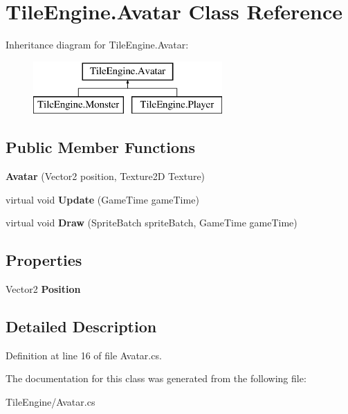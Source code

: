 \hypertarget{class_tile_engine_1_1_avatar}{\section{Tile\-Engine.\-Avatar Class Reference}
\label{class_tile_engine_1_1_avatar}
}
Inheritance diagram for Tile\-Engine.\-Avatar\-:\begin{figure}[H]
\begin{center}
\leavevmode
\includegraphics[height=2.000000cm]{class_tile_engine_1_1_avatar}
\end{center}
\end{figure}
\subsection*{Public Member Functions}
\begin{DoxyCompactItemize}
\item 
\hypertarget{class_tile_engine_1_1_avatar_a9d97952e8a9e1b347c841cfbe614b60b}{{\bfseries Avatar} (Vector2 position, Texture2\-D Texture)}\label{class_tile_engine_1_1_avatar_a9d97952e8a9e1b347c841cfbe614b60b}

\item 
\hypertarget{class_tile_engine_1_1_avatar_afa46c5a32ad8b677a0f2ce2ace163059}{virtual void {\bfseries Update} (Game\-Time game\-Time)}\label{class_tile_engine_1_1_avatar_afa46c5a32ad8b677a0f2ce2ace163059}

\item 
\hypertarget{class_tile_engine_1_1_avatar_a7d6106cb2e838e335d7b285d51312183}{virtual void {\bfseries Draw} (Sprite\-Batch sprite\-Batch, Game\-Time game\-Time)}\label{class_tile_engine_1_1_avatar_a7d6106cb2e838e335d7b285d51312183}

\end{DoxyCompactItemize}
\subsection*{Properties}
\begin{DoxyCompactItemize}
\item 
\hypertarget{class_tile_engine_1_1_avatar_a9c6796fe77c217cfe59d8d1bf96397d1}{Vector2 {\bfseries Position}}\label{class_tile_engine_1_1_avatar_a9c6796fe77c217cfe59d8d1bf96397d1}

\end{DoxyCompactItemize}


\subsection{Detailed Description}


Definition at line 16 of file Avatar.\-cs.



The documentation for this class was generated from the following file\-:\begin{DoxyCompactItemize}
\item 
Tile\-Engine/Avatar.\-cs\end{DoxyCompactItemize}

